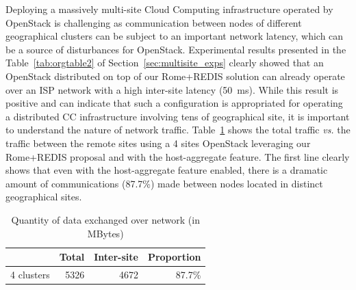Deploying  a massively  multi-site  Cloud Computing  infrastructure operated  by
OpenStack   is  challenging   as  communication   between  nodes   of  different
geographical clusters can be subject to  an important network latency, which can
be a source of disturbances for OpenStack. Experimental results presented in the
Table~\ref{tab:orgtable2}  of  Section~\ref{sec:multisite_exps}  clearly  showed
that an  OpenStack distributed  on top  of our  Rome+REDIS solution  can already
operate over an  ISP network with a high inter-site  latency (50~ms). While this
result is  positive and can indicate  that such a configuration  is appropriated
for operating  a distributed  CC infrastructure  involving tens  of geographical
site,  it   is  important   to  understand  the   nature  of   network  traffic.
Table~\ref{tab:experiments-host-aggregates-network}  shows   the  total  traffic
\textit{vs.} the  traffic between  the remote  sites using  a 4  sites OpenStack
leveraging  our Rome+REDIS  proposal and  with the  host-aggregate feature.  The
first  line clearly  shows that  even with  the host-aggregate  feature enabled,
there is a dramatic amount of communications (87.7\%) made between nodes located
in distinct geographical sites.

\begin{table}[htb]
\vspace{-0.5cm}
\caption{\label{tab:experiments-host-aggregates-network}
  Quantity of data exchanged over network (in MBytes)}
\centering
\begin{tabular}{lrrr}
 & Total  & Inter-site &  Proportion \\
\hline
4 clusters  & 5326 & 4672 & 87.7\% \\
\end{tabular}
\end{table}


